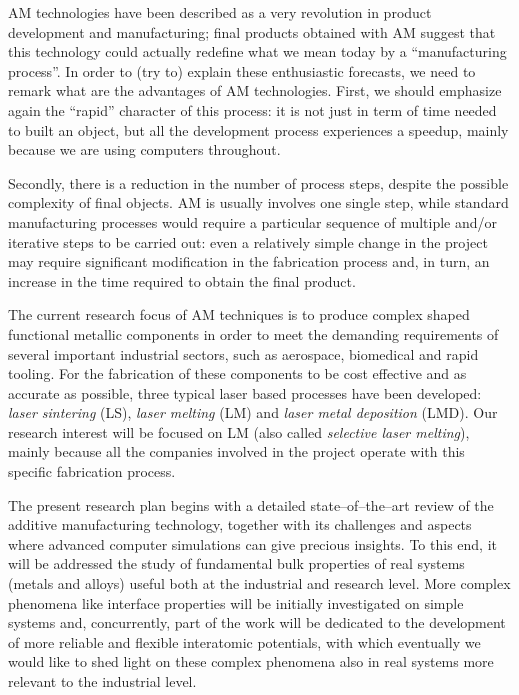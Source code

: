 
AM technologies have been described as a very revolution in product development and manufacturing; final products obtained with AM suggest that this technology could actually redefine what we mean today by a ``manufacturing process''. In order to (try to) explain these enthusiastic forecasts, we need to remark what are the advantages of AM technologies. First, we should emphasize again the ``rapid'' character of this process: it is not just in term of time needed to built an object, but all the development process experiences a speedup, mainly because we are using computers throughout. %

Secondly, there is a reduction in the number of process steps, despite the possible complexity of final objects. AM is usually involves one single step, while standard manufacturing processes would require a particular sequence of multiple and/or iterative steps to be carried out: even a relatively simple change in the project may require significant modification in the fabrication process and, in turn, an increase in the time required to obtain the final product.

The current research focus of AM techniques is to produce complex shaped functional metallic components in order to meet the demanding requirements of several important industrial sectors, such as aerospace, biomedical and rapid tooling.
For the fabrication of these components to be cost effective and as accurate as possible, three typical laser based processes have been developed: \emph{laser sintering} (LS), \emph{laser melting} (LM) and \emph{laser metal deposition} (LMD). Our research interest will be focused on LM (also called \emph{selective laser melting}), mainly because all the companies involved in the project operate with this specific fabrication process.

The present research plan begins with a detailed state--of--the--art review of the additive manufacturing technology, together with its challenges and aspects where advanced computer simulations can give precious insights. To this end, it will be addressed the study of fundamental bulk properties of real systems (metals and alloys) useful both at the industrial and research level. More complex phenomena like interface properties will be initially investigated on simple systems and, concurrently, part of the work will be dedicated to the development of more reliable and flexible interatomic potentials, with which eventually we would like to shed light on these complex phenomena also in real systems more relevant to the industrial level.












